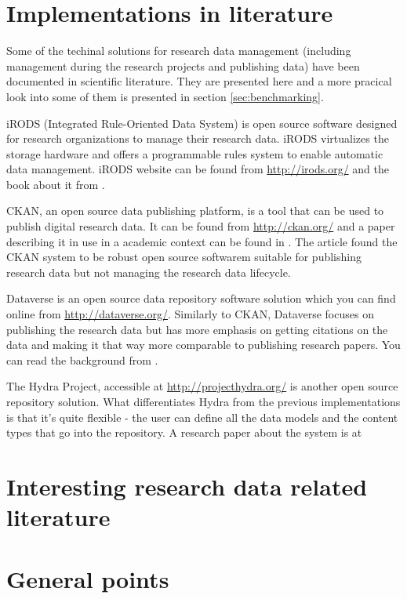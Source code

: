 \section{Implementations in literature}
\label{sec:implementations_literature}

Some of the techinal solutions for research data management (including
management during the research projects and publishing data) have been
documented in scientific literature. They are presented here and a more
pracical look into some of them is presented in section
\ref{sec:benchmarking}.

iRODS (Integrated Rule-Oriented Data System) is open source software designed
for research organizations to manage their research data. iRODS virtualizes the
storage hardware and offers a programmable rules system to enable automatic
data management. iRODS website can be found from \url{http://irods.org/} and
the book about it from \cite{DBLP:series/synthesis/2010Rajasekar}.

CKAN, an open source data publishing platform, is a tool that can be used to
publish digital research data. It can be found from \url{http://ckan.org/} and
a paper describing it in use in a academic context can be found in
\cite{winn2013open}. The article found the CKAN system to be robust open source
softwarem suitable for publishing research data but not managing the research
data lifecycle.

Dataverse is an open source data repository software solution which you can
find online from \url{http://dataverse.org/}. Similarly to CKAN, Dataverse
focuses on publishing the research data but has more emphasis on getting
citations on the data and making it that way more comparable to publishing
research papers. You can read the background from \cite{king2007introduction}.

The Hydra Project, accessible at \url{http://projecthydra.org/} is another open
source repository solution. What differentiates Hydra from the previous
implementations is that it's quite flexible - the user can define all the data
models and the content types that go into the repository. A research paper
about the system is at \cite{awre2009project}

\iffalse

\section{Interesting research data related literature}

\section{General points}


